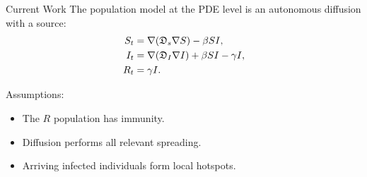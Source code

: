 \begin{slide}{Current Work}
	The population model at the PDE level is an autonomous diffusion with a source:
	\begin{align*}
	S_t	&=	\nabla (\mathfrak{D}_s \nabla S) - \beta SI,	\\
	I_t	&=	\nabla (\mathfrak{D}_I \nabla I) + \beta SI - \gamma I,	\\
	R_t	&=	\gamma I.
	\end{align*}
	
	\vspace{.5cm}
	Assumptions:
	\begin{itemize}
		\item The $R$ population has immunity.
		\item Diffusion performs all relevant spreading.
		\item Arriving infected individuals form local hotspots.
	\end{itemize}
	
\end{slide}